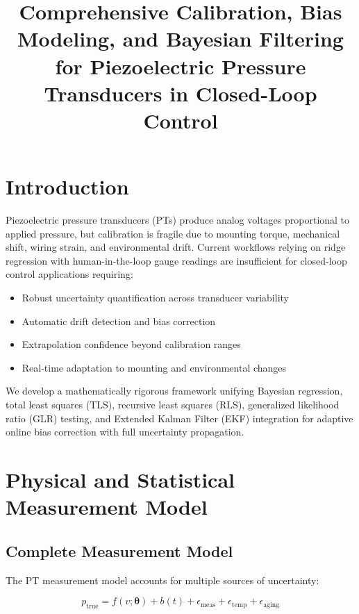 \documentclass[11pt]{article}
\title{Comprehensive Calibration, Bias Modeling, and Bayesian Filtering for Piezoelectric Pressure Transducers in Closed-Loop Control}
\author{}
\date{}
\begin{document}
\maketitle

\section{Introduction}

Piezoelectric pressure transducers (PTs) produce analog voltages proportional to applied pressure, but calibration is fragile due to mounting torque, mechanical shift, wiring strain, and environmental drift. Current workflows relying on ridge regression with human-in-the-loop gauge readings are insufficient for closed-loop control applications requiring:

\begin{itemize}
\item Robust uncertainty quantification across transducer variability
\item Automatic drift detection and bias correction
\item Extrapolation confidence beyond calibration ranges
\item Real-time adaptation to mounting and environmental changes
\end{itemize}

We develop a mathematically rigorous framework unifying Bayesian regression, total least squares (TLS), recursive least squares (RLS), generalized likelihood ratio (GLR) testing, and Extended Kalman Filter (EKF) integration for adaptive online bias correction with full uncertainty propagation.

\section{Physical and Statistical Measurement Model}

\subsection{Complete Measurement Model}

The PT measurement model accounts for multiple sources of uncertainty:

\begin{equation}
p_{\text{true}} = f(v; \bm{\theta}) + b(t) + \epsilon_{\text{meas}} + \epsilon_{\text{temp}} + \epsilon_{\text{aging}}
\end{equation}
\end{document}
